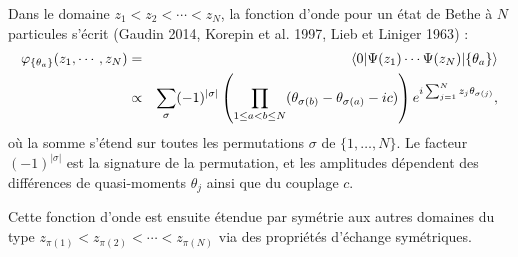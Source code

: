 Dans le domaine $z_1 < z_2 < \cdots < z_N$, la fonction d’onde pour un état de Bethe à $N$ particules s’écrit ({\color{blue}Gaudin 2014}, {\color{blue}Korepin et al. 1997}, {\color{blue}Lieb et Liniger 1963}) :
\begin{eqnarray}
	\varphi_{\{\theta_a\}} ( z_1 , \cdots , z_N ) & = & \langle 0 \vert \Psi ( z_1 ) \cdots \Psi (z_N ) \vert \{ \theta_a \} \rangle \notag\\
	& \propto & \sum_\sigma (-1)^{|\sigma|} \left( \prod_{1 \leq a < b \leq N} (\theta_{\sigma(b)} - \theta_{\sigma(a)} - i c) \right) e^{i \sum_{j=1}^{N} z_j \theta_{\sigma(j)}},\label{eq:I-2-17}
\end{eqnarray}
où la somme s'étend sur toutes les permutations $\sigma$ de $\{1,\dots,N\}$. Le facteur $(-1)^{|\sigma|}$ est la signature de la permutation, et les amplitudes dépendent des différences de quasi-moments $\theta_j$ ainsi que du couplage $c$.

Cette fonction d’onde est ensuite étendue par symétrie aux autres domaines du type $z_{\pi(1)} < z_{\pi(2)} < \cdots < z_{\pi(N)}$ via des propriétés d’échange symétriques.
